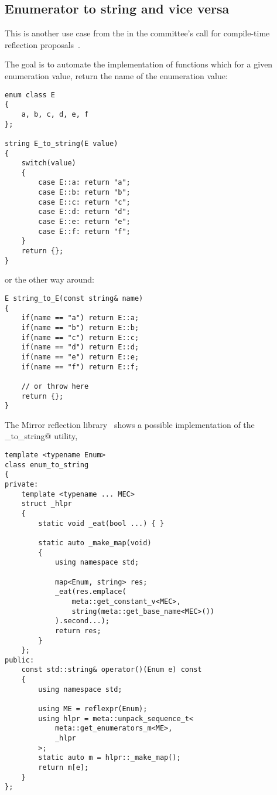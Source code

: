 \subsection{Enumerator to string and vice versa}
\label{use-case-enum-to-string}

This is another use case from the  in the committee's
call for compile-time reflection proposals~\cite{ISOCPP-N3814}. 

The goal is to automate the implementation of functions which for a given
enumeration value, return the name of the enumeration value:

\begin{verbatim}
enum class E
{
	a, b, c, d, e, f
};

string E_to_string(E value)
{
	switch(value)
	{
		case E::a: return "a";
		case E::b: return "b";
		case E::c: return "c";
		case E::d: return "d";
		case E::e: return "e";
		case E::f: return "f";
	}
	return {};
}
\end{verbatim}

or the other way around:

\begin{verbatim}
E string_to_E(const string& name)
{
	if(name == "a") return E::a;
	if(name == "b") return E::b;
	if(name == "c") return E::c;
	if(name == "d") return E::d;
	if(name == "e") return E::e;
	if(name == "f") return E::f;

	// or throw here
	return {};
}
\end{verbatim}

The Mirror reflection library~\cite{Chochlik-Mirror-new-doc} shows a possible
implementation of the \verb@enum_to_string@ utility,

\begin{verbatim}
template <typename Enum>
class enum_to_string
{
private:
	template <typename ... MEC>
	struct _hlpr
	{
		static void _eat(bool ...) { }

		static auto _make_map(void)
		{
			using namespace std;

			map<Enum, string> res;
			_eat(res.emplace(
				meta::get_constant_v<MEC>,
				string(meta::get_base_name<MEC>())
			).second...);
			return res;
		}
	};
public:
	const std::string& operator()(Enum e) const
	{
		using namespace std;

		using ME = reflexpr(Enum);
		using hlpr = meta::unpack_sequence_t<
			meta::get_enumerators_m<ME>,
			_hlpr
		>;
		static auto m = hlpr::_make_map();
		return m[e];
	}
};
\end{verbatim}

